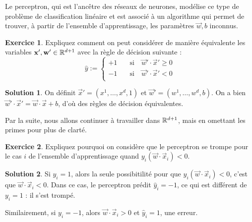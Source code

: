 \documentclass[a4paper,francais]{article}
\newcommand{\R}{{\ensuremath\mathbb{R}}}
\theoremstyle{definition}
\newtheorem{exercice}{Exercice}[section]
\newtheorem*{solution}{Solution}
\begin{document}
Le perceptron, qui est l'ancêtre des réseaux de neurones, modélise ce type
de problème de classification linéaire et est associé à un algorithme qui
permet de trouver, à partir de l'ensemble d'apprentissage, les paramètres
$\vec{w},b$ inconnus. 

\begin{exercice}
  Expliquez comment on peut considérer de manière équivalente
  les variables $\vec{x}', \vec{w}' \in \R^{d+1}$ avec la règle de décision
  suivante :
  \[
  \hat{y} :=
  \left\{
  \begin{array}{ll}
    +1 & \quad \mathrm{si}\quad \vec{w}'\cdot\vec{x}' \geq 0 \\
    -1 & \quad \mathrm{si}\quad \vec{w}'\cdot\vec{x}' < 0 \\
  \end{array}
  \right.
  \]
\end{exercice}

\begin{solution}
  On définit $\vec{x}' = (x^1, \dots, x^d, 1)$ et
  $\vec{w}' = (w^1, \dots, w^d, b)$. On a bien
  $\vec{w}'\cdot\vec{x}' = \vec{w}\cdot\vec{x} + b$,
  d'où des règles de décision équivalentes. 
\end{solution}

Par la suite, nous allons continuer à travailler dans $\R^{d+1}$,
mais en omettant les primes pour plus de clarté. 

\begin{exercice}
  Expliquez pourquoi on considère que le perceptron se trompe pour le cas $i$
  de l'ensemble d'apprentissage quand $y_i (\vec{w}\cdot\vec{x}_i) < 0$.
\end{exercice}

\begin{solution}
  Si $y_i = 1$, alors la seule possibitilité pour que
  $y_i (\vec{w}\cdot\vec{x}_i) < 0$, c'est que
  $\vec{w}\cdot\vec{x}_i < 0$. Dans ce cas, le perceptron prédit
  $\hat{y}_i = -1$, ce qui est différent de $y_i = 1$ : il s'est trompé.

  Similairement, si $y_i = -1$, alors $\vec{w}\cdot\vec{x}_i > 0$
  et $\hat{y}_i = 1$, une erreur. 
\end{solution}

\end{document}
